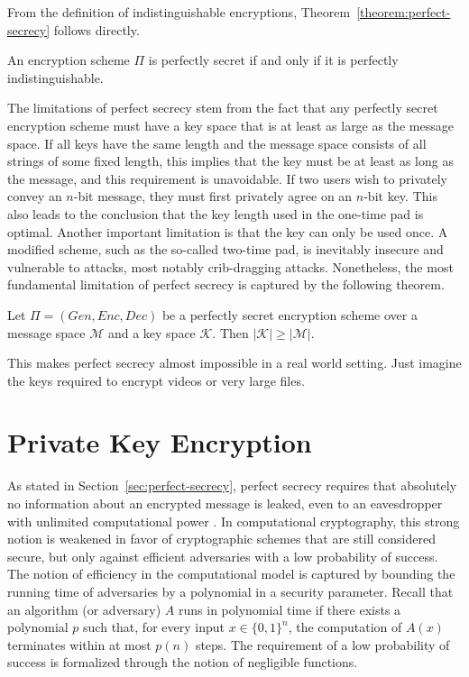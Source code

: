 From the definition of indistinguishable encryptions, Theorem~\ref{theorem:perfect-secrecy} follows directly.
\begin{theorem}\label{theorem:perfect-secrecy}
An encryption scheme $\Pi$ is perfectly secret if and only if it is perfectly indistinguishable.
\end{theorem}
The limitations of perfect secrecy stem from the fact that any perfectly secret encryption scheme must have a key space that is at least as large as the message space. If all keys have the same length and the message space consists of all strings of some fixed length, this implies that the key must be at least as long as the message, and this requirement is unavoidable. If two users wish to privately convey an $n$-bit message, they must first privately agree on an $n$-bit key. This also leads to the conclusion that the key length used in the one-time pad is optimal. Another important limitation is that the key can only be used once. A modified scheme, such as the so-called two-time pad, is inevitably insecure and vulnerable to attacks, most notably crib-dragging attacks. Nonetheless, the most fundamental limitation of perfect secrecy is captured by the following theorem.
\begin{theorem}
Let $\Pi = (Gen, Enc, Dec)$ be a perfectly secret encryption scheme over a message space $\mathcal{M}$ and a key space $\mathcal{K}$. Then $|\mathcal{K}| \geq |\mathcal{M}|$.
\end{theorem}
This makes perfect secrecy almost impossible in a real world setting. Just imagine the keys required to encrypt videos or very large files.

\section{Private Key Encryption}
As stated in Section~\ref{sec:perfect-secrecy}, perfect secrecy requires that absolutely no information about an encrypted message is leaked, even to an eavesdropper with unlimited computational power \cite{introduction-to-modern-cryptography}. In computational cryptography, this strong notion is weakened in favor of cryptographic schemes that are still considered secure, but only against efficient adversaries with a low probability of success. The notion of efficiency in the computational model is captured by bounding the running time of adversaries by a polynomial in a security parameter. Recall that an algorithm (or adversary) $A$ runs in polynomial time if there exists a polynomial $p$ such that, for every input $x \in \{0,1\}^n$, the computation of $A(x)$ terminates within at most $p(n)$ steps. The requirement of a low probability of success is formalized through the notion of negligible functions.

